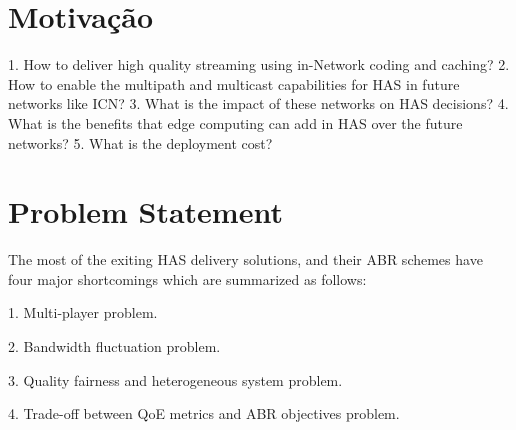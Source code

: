 \section{Motivação}




1. How to deliver high quality streaming using in-Network coding and caching?
2. How to enable the multipath and multicast capabilities for HAS in future networks like ICN?
3. What is the impact of these networks on HAS decisions?
4. What is the benefits that edge computing can add in HAS over the future networks?
5. What is the deployment cost?


\section{Problem Statement}

The most of the exiting HAS delivery solutions, and their ABR schemes have four major shortcomings which are summarized as follows:

1. Multi-player problem.

2. Bandwidth fluctuation problem.

3. Quality fairness and heterogeneous system problem.

4. Trade-off between QoE metrics and ABR objectives problem.
